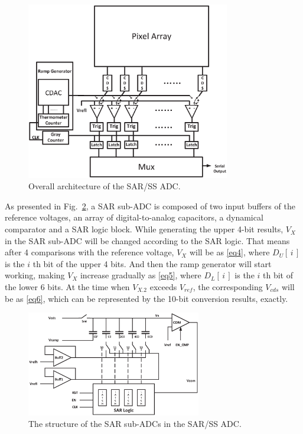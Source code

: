 \begin{figure}[htbp]
  \centerline{\includegraphics[width=3.5in]{./Figures/SARADC.eps}}
  \caption{Overall architecture of the SAR/SS ADC.}
  \label{SARADC}
  \end{figure} 

As presented in Fig.~\ref{SAR}, a SAR sub-ADC is composed of two input buffers of the reference voltages, an array of digital-to-analog capacitors, a dynamical comparator and a SAR logic block. While generating the upper 4-bit results, $V_{X}$ in the SAR sub-ADC will be changed according to the SAR logic. That means after 4 comparisons 
with the reference voltage, $V_{X}$ will be as \eqref{eq4}, where $D_{U}\left[\,i\,\right]$ is the $i$ th bit of the upper 4 bits. 
And then the ramp generator will start working, making $V_{X}$ increase gradually as \eqref{eq5}, where $D_{L}\left[\,i\,\right]$ is the $i$ th bit of the lower 6 bits. 
At the time when $V_{X.2}$ exceeds $V_{ref}$, the corresponding $V_{cds}$ will be as \eqref{eq6}, which can be represented by the 10-bit conversion results, exactly.

\begin{figure}[htbp]
	\centerline{\includegraphics[width=3in]{./Figures/SAR.eps}}
	\caption{The structure of the SAR sub-ADCs in the SAR/SS ADC.}
	\label{SAR}
\end{figure}

